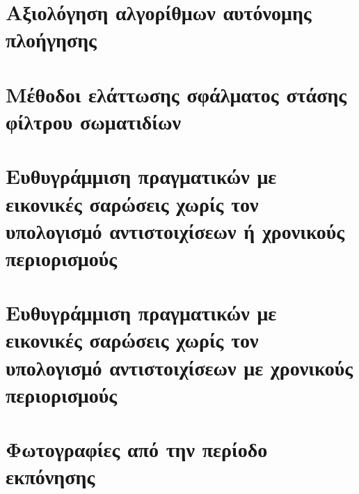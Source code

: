 \chapter{Αξιολόγηση αλγορίθμων αυτόνομης πλοήγησης}
  \label{appendix:01}
  

\chapter{Μέθοδοι ελάττωσης σφάλματος στάσης φίλτρου σωματιδίων}
  \label{appendix:02}
  

\chapter{Ευθυγράμμιση πραγματικών με εικονικές σαρώσεις χωρίς τον υπολογισμό αντιστοιχίσεων ή χρονικούς περιορισμούς}
  \label{appendix:03}
  

\chapter{Ευθυγράμμιση πραγματικών με εικονικές σαρώσεις χωρίς τον υπολογισμό αντιστοιχίσεων με χρονικούς περιορισμούς}
  \label{appendix:04}
  

\chapter{Φωτογραφίες από την περίοδο εκπόνησης}
  \label{appendix:06}
  
